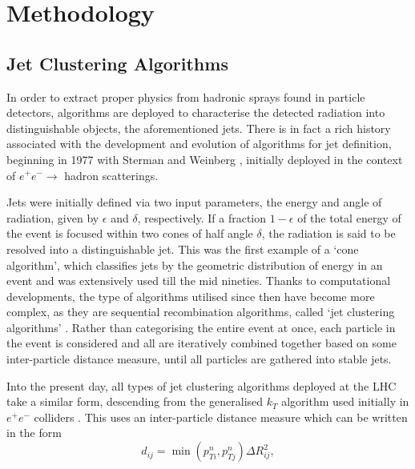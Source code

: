 \documentclass[12pt]{article}
\begin{document}
\section{Methodology}
\subsection{Jet Clustering Algorithms}
In order to extract proper physics from hadronic sprays found in particle detectors,  algorithms are deployed to characterise the detected radiation into distinguishable objects, the aforementioned jets.
There is in fact a rich history associated with the development and evolution of algorithms for jet definition, beginning in 1977 with Sterman and Weinberg \cite{Sterman:1977wj}, initially deployed in the context of $e^+ e^- \rightarrow$ hadron scatterings.

Jets were initially defined via two input parameters, the energy and angle of radiation, given by $\epsilon$ and $\delta$, respectively. If a fraction $1-\epsilon$ of the total energy of the event is focused within two cones of half angle $\delta$, the radiation is said to be resolved into a distinguishable jet.  This was the first example of a `cone algorithm', which classifies jets by the geometric distribution of energy in an event and was extensively used till the mid nineties. Thanks to computational developments, the type of algorithms utilised since then have become more complex, as they are sequential recombination algorithms, called `jet clustering algorithms'  \cite{Moretti:1998qx}. Rather than categorising the entire event at once, each particle in the event is considered and all  are iteratively combined together based on some inter-particle distance measure, until all particles are gathered into stable jets.

Into the present day, all types of jet clustering algorithms deployed at the LHC take a similar form, descending from the generalised $k_T$ algorithm used initially in $e^+e^-$ colliders  \cite{Moretti:1998qx}. This uses an inter-particle distance measure which can be written in the form
%
\begin{equation}\label{eqn:dij}
d_{ij} = \min(p_{Ti}^n,p_{Tj}^n)\Delta R^2_{ij},
\end{equation}
\end{document}
